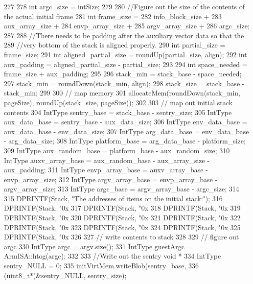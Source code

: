 \begin{DoxyCode}
{277 
278     int argc_size = intSize;
279 
280     //Figure out the size of the contents of the actual initial frame
281     int frame_size =
282         info_block_size +
283         aux_array_size +
284         envp_array_size +
285         argv_array_size +
286         argc_size;
287 
288     //There needs to be padding after the auxiliary vector data so that the
289     //very bottom of the stack is aligned properly.
290     int partial_size = frame_size;
291     int aligned_partial_size = roundUp(partial_size, align);
292     int aux_padding = aligned_partial_size - partial_size;
293 
294     int space_needed = frame_size + aux_padding;
295 
296     stack_min = stack_base - space_needed;
297     stack_min = roundDown(stack_min, align);
298     stack_size = stack_base - stack_min;
299 
300     // map memory
301     allocateMem(roundDown(stack_min, pageSize), roundUp(stack_size, pageSize));
302 
303     // map out initial stack contents
304     IntType sentry_base = stack_base - sentry_size;
305     IntType aux_data_base = sentry_base - aux_data_size;
306     IntType env_data_base = aux_data_base - env_data_size;
307     IntType arg_data_base = env_data_base - arg_data_size;
308     IntType platform_base = arg_data_base - platform_size;
309     IntType aux_random_base = platform_base - aux_random_size;
310     IntType auxv_array_base = aux_random_base - aux_array_size - aux_padding;
311     IntType envp_array_base = auxv_array_base - envp_array_size;
312     IntType argv_array_base = envp_array_base - argv_array_size;
313     IntType argc_base = argv_array_base - argc_size;
314 
315     DPRINTF(Stack, "The addresses of items on the initial stack:\n");
316     DPRINTF(Stack, "0x%
317     DPRINTF(Stack, "0x%
318     DPRINTF(Stack, "0x%
319     DPRINTF(Stack, "0x%
320     DPRINTF(Stack, "0x%
321     DPRINTF(Stack, "0x%
322     DPRINTF(Stack, "0x%
323     DPRINTF(Stack, "0x%
324     DPRINTF(Stack, "0x%
325     DPRINTF(Stack, "0x%
326 
327     // write contents to stack
328 
329     // figure out argc
330     IntType argc = argv.size();
331     IntType guestArgc = ArmISA::htog(argc);
332 
333     //Write out the sentry void *
334     IntType sentry_NULL = 0;
335     initVirtMem.writeBlob(sentry_base,
336             (uint8_t*)&sentry_NULL, sentry_size);
}
\end{DoxyCode}

